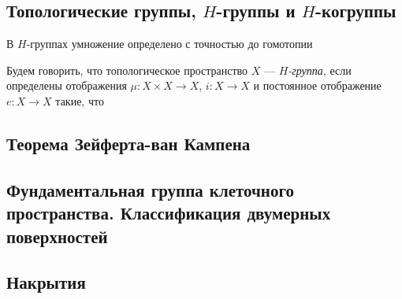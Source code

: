 \subsection{Топологические группы, $H$-группы и $H$-когруппы}
В $H$-группах умножение определено с точностью до гомотопии
\begin{defin}
	Будем говорить, что топологическое пространство $X$ --- \textit{$H$-группа}, если определены отображения $\mu\colon X\times X\to X$, $i\colon X\to X$ и постоянное отображение $e\colon X\to X$ такие, что

\end{defin}

\subsection{Теорема Зейферта-ван Кампена}


\subsection{Фундаментальная группа клеточного пространства. Классификация двумерных поверхностей}

\subsection{Накрытия}
